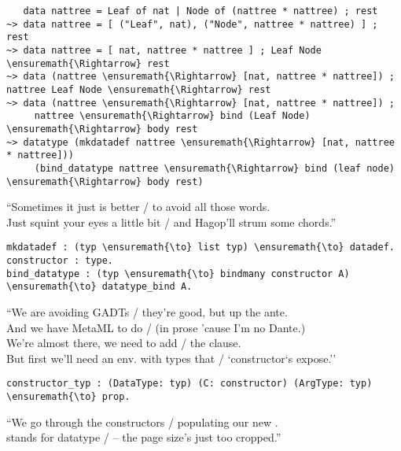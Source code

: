 \begin{verbatim}
   data nattree = Leaf of nat | Node of (nattree * nattree) ; rest
~> data nattree = [ ("Leaf", nat), ("Node", nattree * nattree) ] ; rest
~> data nattree = [ nat, nattree * nattree ] ; Leaf Node \ensuremath{\Rightarrow} rest
~> data (nattree \ensuremath{\Rightarrow} [nat, nattree * nattree]) ; nattree Leaf Node \ensuremath{\Rightarrow} rest
~> data (nattree \ensuremath{\Rightarrow} [nat, nattree * nattree]) ;
     nattree \ensuremath{\Rightarrow} bind (Leaf Node) \ensuremath{\Rightarrow} body rest
~> datatype (mkdatadef nattree \ensuremath{\Rightarrow} [nat, nattree * nattree]))
     (bind_datatype nattree \ensuremath{\Rightarrow} bind (leaf node) \ensuremath{\Rightarrow} body rest)
\end{verbatim}

\begin{versy}
``Sometimes it just is better / to avoid all those words. \\
Just squint your eyes a little bit / and Hagop'll strum some chords.''
\end{versy}

\begin{verbatim}
mkdatadef : (typ \ensuremath{\to} list typ) \ensuremath{\to} datadef.
constructor : type.
bind_datatype : (typ \ensuremath{\to} bindmany constructor A) \ensuremath{\to} datatype_bind A.
\end{verbatim}

\begin{versy}
``We are avoiding GADTs / they're good, but up the ante. \\
And we have MetaML to do / (in prose 'cause I'm no Dante.) \\
We're almost there, we need to add / the  clause. \\
But first we'll need an env. with types that / `constructor`s expose.''
\end{versy}

\begin{verbatim}
constructor_typ : (DataType: typ) (C: constructor) (ArgType: typ) \ensuremath{\to} prop.
\end{verbatim}

\begin{versy}
``We go through the constructors / populating our new . \\
 stands for datatype / -- the page size's just too cropped.''
\end{versy}

